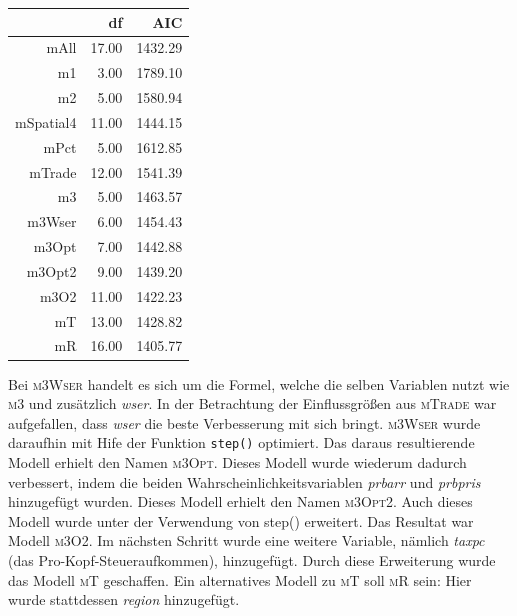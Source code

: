 \begin{table}[ht]
\centering
\begin{tabular}{rrr}
  \hline
 & df & AIC \\ 
  \hline
mAll & 17.00 & 1432.29 \\ 
  m1 & 3.00 & 1789.10 \\ 
  m2 & 5.00 & 1580.94 \\ 
  mSpatial4 & 11.00 & 1444.15 \\ 
  mPct & 5.00 & 1612.85 \\ 
  mTrade & 12.00 & 1541.39 \\ 
  m3 & 5.00 & 1463.57 \\ 
  m3Wser & 6.00 & 1454.43 \\ 
  m3Opt & 7.00 & 1442.88 \\ 
  m3Opt2 & 9.00 & 1439.20 \\ 
  m3O2 & 11.00 & 1422.23 \\ 
  mT & 13.00 & 1428.82 \\ 
  mR & 16.00 & 1405.77 \\ 
   \hline
\end{tabular}
\end{table}

Bei \textsc{m3Wser} handelt es sich um die Formel, welche die selben Variablen nutzt wie \textsc{m3} und zus\"atzlich \textit{wser}.
In der Betrachtung der Einflussgr\"o\ss{}en aus \textsc{mTrade} war aufgefallen, dass \textit{wser} die beste Verbesserung mit sich bringt.
\textsc{m3Wser} wurde daraufhin mit Hife der Funktion \texttt{step()} optimiert.
Das daraus resultierende Modell erhielt den Namen \textsc{m3Opt}.
Dieses Modell wurde wiederum dadurch verbessert, indem die beiden Wahrscheinlichkeitsvariablen \textit{prbarr} und \textit{prbpris} hinzugef\"ugt wurden.
Dieses Modell erhielt den Namen \textsc{m3Opt2}.
Auch dieses Modell wurde unter der Verwendung von step() erweitert. Das Resultat war Modell \textsc{m3O2}.
Im n\"achsten Schritt wurde eine weitere Variable, n\"amlich \textit{taxpc} (das Pro-Kopf-Steueraufkommen), hinzugef\"ugt.
Durch diese Erweiterung wurde das Modell \textsc{mT} geschaffen.
Ein alternatives Modell zu \textsc{mT} soll \textsc{mR} sein: Hier wurde stattdessen \textit{region} hinzugef\"ugt.  



